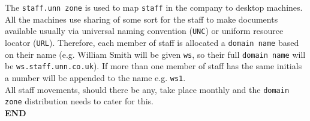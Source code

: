\documentclass[11pt]{article}
\begin{document}
The \texttt{staff.unn zone} is used to map \texttt{staff} in the company to desktop machines. All the machines use sharing of some sort for the staff to 
make documents available usually via universal naming convention (\texttt{UNC}) or uniform resource locator (\texttt{URL}). Therefore, each member of staff 
is allocated a \texttt{domain name} based on their name (e.g. William Smith will be given \texttt{ws}, so their full \texttt{domain name} will be 
\texttt{ws.staff.unn.co.uk}). If more than one member of staff has the same initials a number will be appended to the name e.g. \texttt{ws1}.\\

\noindent All staff movements, should there be any, take place monthly and the \texttt{domain zone} distribution needs to cater for this.\\

\noindent \textbf{END}
\end{document}
